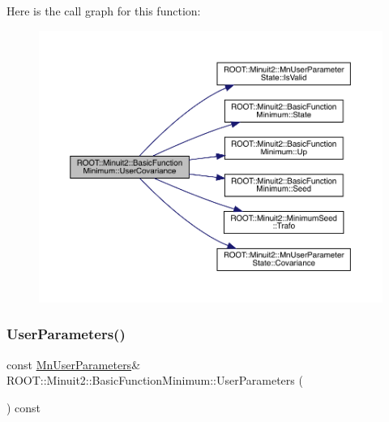 Here is the call graph for this function\+:
\nopagebreak
\begin{figure}[H]
\begin{center}
\leavevmode
\includegraphics[width=350pt]{de/d25/classROOT_1_1Minuit2_1_1BasicFunctionMinimum_a4f06adfe70411becfe7aa48f6bce1f22_cgraph}
\end{center}
\end{figure}
\mbox{\label{classROOT_1_1Minuit2_1_1BasicFunctionMinimum_aa6fa4f1678939015849b6a2ab6023238}} 
\subsubsection{\texorpdfstring{UserParameters()}{UserParameters()}\hspace{0.1cm}{\footnotesize\ttfamily [1/2]}}
{\footnotesize\ttfamily const \mbox{\hyperlink{classROOT_1_1Minuit2_1_1MnUserParameters}{Mn\+User\+Parameters}}\& R\+O\+O\+T\+::\+Minuit2\+::\+Basic\+Function\+Minimum\+::\+User\+Parameters (\begin{DoxyParamCaption}{ }\end{DoxyParamCaption}) const\hspace{0.3cm}{\ttfamily [inline]}}

